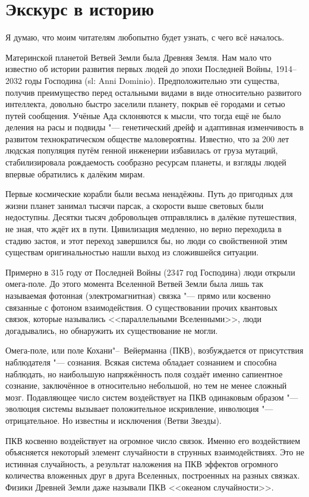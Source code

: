 \documentclass[a4paper,10pt,fleqn]{book}
\begin{document}
\section{Экскурс в историю}

Я думаю, что моим читателям любопытно будет узнать, с чего всё началось.

Материнской планетой Ветвей Земли была Древняя Земля.
Нам мало что известно об истории развития первых людей до эпохи Последней Войны, 1914--2032 годы Господина (sl: Anni Dominio).
Предположительно эти существа, получив преимущество перед остальными видами в виде относительно развитого интеллекта, довольно быстро заселили планету, покрыв её городами и сетью путей сообщения.
Учёные Ада склоняются к мысли, что тогда ещё не было деления на расы и подвиды "--- генетический дрейф и адаптивная изменчивость в развитом технократическом обществе маловероятны.
Известно, что за 200 лет людская популяция путём генной инженерии избавилась от груза мутаций, стабилизировала рождаемость сообразно ресурсам планеты, и взгляды людей впервые обратились к далёким мирам.

Первые космические корабли были весьма ненадёжны.
Путь до пригодных для жизни планет занимал тысячи парсак, а скорости выше световых были недоступны.
Десятки тысяч добровольцев отправлялись в далёкие путешествия, не зная, что ждёт их в пути.
Цивилизация медленно, но верно переходила в стадию застоя, и этот переход завершился бы, но люди со свойственной этим существам оригинальностью нашли выход из сложившейся ситуации.

Примерно в 315 году от Последней Войны (2347 год Господина) люди открыли омега-поле.
До этого момента Вселенной Ветвей Земли была лишь так называемая фотонная (электромагнитная) связка "--- прямо или косвенно связанные с фотоном взаимодействия.
О существовании прочих квантовых связок, которые назывались <<параллельными Вселенными>>, люди догадывались, но обнаружить их существование не могли.

Омега-поле, или поле Кохани"--~Вейерманна (ПКВ), возбуждается от присутствия наблюдателя "--- сознания.
Всякая система обладает сознанием и способна наблюдать, но наибольшую напряжённость поля создаёт именно сапиентное сознание, заключённое в относительно небольшой, но тем не менее сложный мозг.
Подавляющее число систем воздействует на ПКВ одинаковым образом "--- эволюция системы вызывает положительное искривление, инволюция "--- отрицательное.
Но известны и исключения (Ветви Звезды).

ПКВ косвенно воздействует на огромное число связок.
Именно его воздействием объясняется некоторый элемент случайности в струнных взаимодействиях.
Это не истинная случайность, а результат наложения на ПКВ эффектов огромного количества вложенных друг в друга Вселенных, построенных на разных связках.
Физики Древней Земли даже называли ПКВ <<океаном случайности>>.
\end{document}
